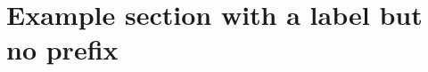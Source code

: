 \documentclass{grattan}
\begin{document}
\section{Example section with a label but no prefix}\label{invalid-prefix}
\end{document}
